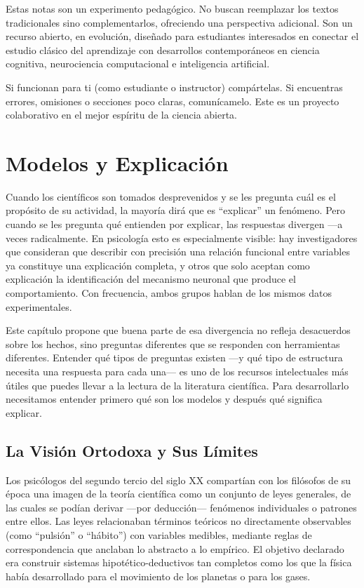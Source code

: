 \documentclass[
  letterpaper,
  DIV=11,
  numbers=noendperiod]{scrreprt}
\begin{document}
Estas notas son un experimento pedagógico. No buscan reemplazar los
textos tradicionales sino complementarlos, ofreciendo una perspectiva
adicional. Son un recurso abierto, en evolución, diseñado para
estudiantes interesados en conectar el estudio clásico del aprendizaje
con desarrollos contemporáneos en ciencia cognitiva, neurociencia
computacional e inteligencia artificial.

Si funcionan para ti (como estudiante o instructor) compártelas. Si
encuentras errores, omisiones o secciones poco claras, comunícamelo.
Este es un proyecto colaborativo en el mejor espíritu de la ciencia
abierta.


\chapter{Modelos y Explicación}\label{modelos-y-explicaciuxf3n}

Cuando los científicos son tomados desprevenidos y se les pregunta cuál
es el propósito de su actividad, la mayoría dirá que es ``explicar'' un
fenómeno. Pero cuando se les pregunta qué entienden por explicar, las
respuestas divergen ---a veces radicalmente. En psicología esto es
especialmente visible: hay investigadores que consideran que describir
con precisión una relación funcional entre variables ya constituye una
explicación completa, y otros que solo aceptan como explicación la
identificación del mecanismo neuronal que produce el comportamiento. Con
frecuencia, ambos grupos hablan de los mismos datos experimentales.

Este capítulo propone que buena parte de esa divergencia no refleja
desacuerdos sobre los hechos, sino preguntas diferentes que se responden
con herramientas diferentes. Entender qué tipos de preguntas existen
---y qué tipo de estructura necesita una respuesta para cada una--- es
uno de los recursos intelectuales más útiles que puedes llevar a la
lectura de la literatura científica. Para desarrollarlo necesitamos
entender primero qué son los modelos y después qué significa explicar.

\section{La Visión Ortodoxa y Sus
Límites}\label{la-visiuxf3n-ortodoxa-y-sus-luxedmites}

Los psicólogos del segundo tercio del siglo XX compartían con los
filósofos de su época una imagen de la teoría científica como un
conjunto de leyes generales, de las cuales se podían derivar ---por
deducción--- fenómenos individuales o patrones entre ellos. Las leyes
relacionaban términos teóricos no directamente observables (como
``pulsión'' o ``hábito'') con variables medibles, mediante reglas de
correspondencia que anclaban lo abstracto a lo empírico. El objetivo
declarado era construir sistemas hipotético-deductivos tan completos
como los que la física había desarrollado para el movimiento de los
planetas o para los gases.
\end{document}
